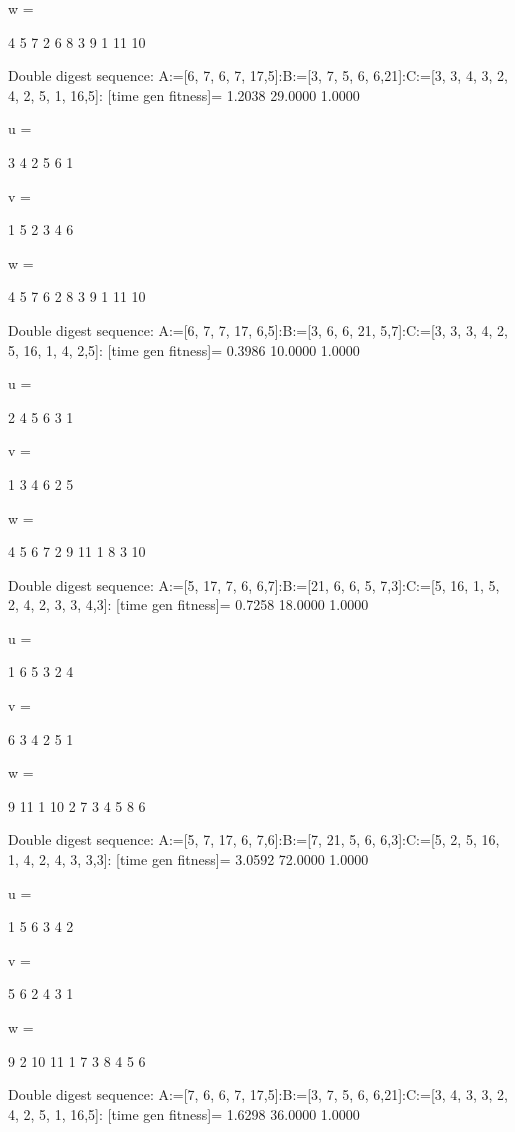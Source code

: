 w =

     4     5     7     2     6     8     3     9     1    11    10

Double digest sequence:
A:=[6, 7, 6, 7, 17,5]:B:=[3, 7, 5, 6, 6,21]:C:=[3, 3, 4, 3, 2, 4, 2, 5, 1, 16,5]:
[time gen fitness]=
    1.2038   29.0000    1.0000


u =

     3     4     2     5     6     1


v =

     1     5     2     3     4     6


w =

     4     5     7     6     2     8     3     9     1    11    10

Double digest sequence:
A:=[6, 7, 7, 17, 6,5]:B:=[3, 6, 6, 21, 5,7]:C:=[3, 3, 3, 4, 2, 5, 16, 1, 4, 2,5]:
[time gen fitness]=
    0.3986   10.0000    1.0000


u =

     2     4     5     6     3     1


v =

     1     3     4     6     2     5


w =

     4     5     6     7     2     9    11     1     8     3    10

Double digest sequence:
A:=[5, 17, 7, 6, 6,7]:B:=[21, 6, 6, 5, 7,3]:C:=[5, 16, 1, 5, 2, 4, 2, 3, 3, 4,3]:
[time gen fitness]=
    0.7258   18.0000    1.0000


u =

     1     6     5     3     2     4


v =

     6     3     4     2     5     1


w =

     9    11     1    10     2     7     3     4     5     8     6

Double digest sequence:
A:=[5, 7, 17, 6, 7,6]:B:=[7, 21, 5, 6, 6,3]:C:=[5, 2, 5, 16, 1, 4, 2, 4, 3, 3,3]:
[time gen fitness]=
    3.0592   72.0000    1.0000


u =

     1     5     6     3     4     2


v =

     5     6     2     4     3     1


w =

     9     2    10    11     1     7     3     8     4     5     6

Double digest sequence:
A:=[7, 6, 6, 7, 17,5]:B:=[3, 7, 5, 6, 6,21]:C:=[3, 4, 3, 3, 2, 4, 2, 5, 1, 16,5]:
[time gen fitness]=
    1.6298   36.0000    1.0000


